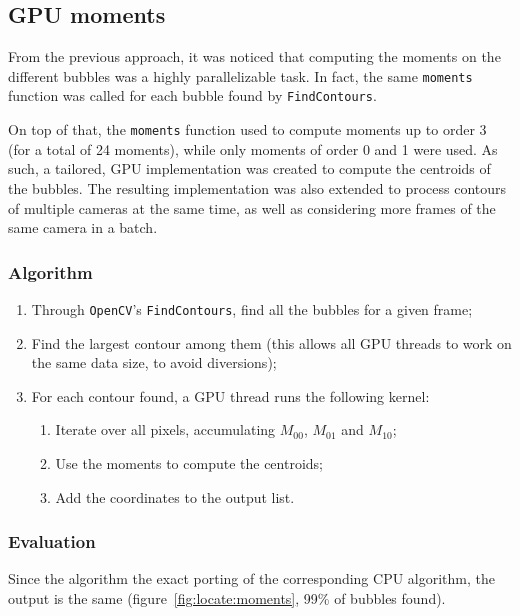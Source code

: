 \subsection{GPU moments}
\label{sec:locate:gpu-moments}

From the previous approach, it was noticed that computing the moments on the different bubbles was a highly parallelizable task.
In fact, the same \texttt{moments} function was called for each bubble found by \texttt{FindContours}.

On top of that, the \texttt{moments} function used to compute moments up to order 3 (for a total of 24 moments), while only moments of order 0 and 1 were used.
As such, a tailored, GPU implementation was created to compute the centroids of the bubbles.
The resulting implementation was also extended to process contours of multiple cameras at the same time,  as well as considering more frames of the same camera in a batch.

\subsubsection{Algorithm}

\begin{enumerate}
	\itemsep 0em
	\item Through \texttt{OpenCV}'s \texttt{FindContours}, find all the bubbles for a given frame;
	\item Find the largest contour among them (this allows all GPU threads to work on the same data size, to avoid diversions);
	\item For each contour found, a GPU thread runs the following kernel:
	      \begin{enumerate}
		      \item Iterate over all pixels, accumulating $M_{00}$, $M_{01}$ and $M_{10}$;
		      \item Use the moments to compute the centroids;
		      \item Add the coordinates to the output list.
	      \end{enumerate}
\end{enumerate}

\subsubsection{Evaluation}

Since the algorithm the exact porting of the corresponding CPU algorithm, the output is the same (figure~\ref{fig:locate:moments}, 99\% of bubbles found).

